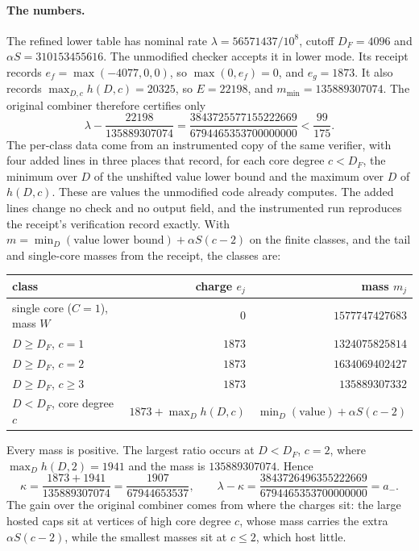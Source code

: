 \documentclass[11pt]{article}
\theoremstyle{remark}
\numberwithin{equation}{section}
\begin{document}
\paragraph{The numbers.}
The refined lower table has nominal rate $\lambda=56571437/10^8$, cutoff $D_F=4096$ and $\alpha S=310153455616$. The unmodified checker accepts it in lower mode. Its receipt records $e_f=\max(-4077,0,0)$, so $\max(0,e_f)=0$, and $e_g=1873$. It also records $\max_{D,c}h(D,c)=20325$, so $E=22198$, and $m_{\min}=135889307074$. The original combiner therefore certifies only
\[
 \lambda-\frac{22198}{135889307074}=\frac{3843725577155222669}{6794465353700000000}<\frac{99}{175}.
\]
The per-class data come from an instrumented copy of the same verifier, with four added lines in three places that record, for each core degree $c<D_F$, the minimum over $D$ of the unshifted value lower bound and the maximum over $D$ of $h(D,c)$. These are values the unmodified code already computes. The added lines change no check and no output field, and the instrumented run reproduces the receipt's verification record exactly. With $m=\min_D(\text{value lower bound})+\alpha S(c-2)$ on the finite classes, and the tail and single-core masses from the receipt, the classes are:
\begin{center}\small
\begin{tabular}{@{}lrr@{}}
\toprule
class & charge $e_j$ & mass $m_j$\\
\midrule
single core ($C=1$), mass $W$ & $0$ & $1577747427683$\\
$D\ge D_F$, $c=1$ & $1873$ & $1324075825814$\\
$D\ge D_F$, $c=2$ & $1873$ & $1634069402427$\\
$D\ge D_F$, $c\ge3$ & $1873$ & $135889307332$\\
$D<D_F$, core degree $c$ & $1873+\max_Dh(D,c)$ & $\min_D(\text{value})+\alpha S(c-2)$\\
\bottomrule
\end{tabular}
\end{center}
Every mass is positive. The largest ratio occurs at $D<D_F$, $c=2$, where $\max_Dh(D,2)=1941$ and the mass is $135889307074$. Hence
\[
 \kappa=\frac{1873+1941}{135889307074}=\frac{1907}{67944653537},\qquad
 \lambda-\kappa=\frac{3843726496355222669}{6794465353700000000}=a_- .
\]
The gain over the original combiner comes from where the charges sit: the large hosted caps sit at vertices of high core degree $c$, whose mass carries the extra $\alpha S(c-2)$, while the smallest masses sit at $c\le2$, which host little.
\end{document}
